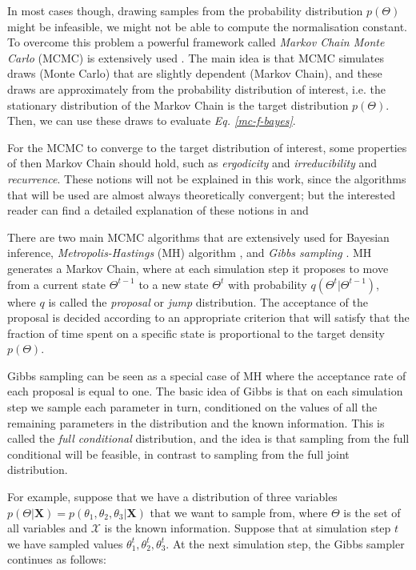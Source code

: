 In most cases though, drawing samples from the probability distribution $p(\Theta)$ might be infeasible, \eg we might not be able to compute the normalisation constant. To overcome this problem a powerful framework called \emph{Markov Chain Monte Carlo} (MCMC) is extensively used \citep{Neal1998}. The main idea is that MCMC simulates draws (\ie Monte Carlo) that are slightly dependent (\ie Markov Chain), and these draws are approximately from the probability distribution of interest, i.e. the stationary distribution of the Markov Chain is the target distribution $p(\Theta)$. Then, we can use these draws to evaluate \emph{Eq. \ref{mc-f-bayes}}.

For the MCMC to converge to the target distribution of interest, some properties of then Markov Chain should hold, such as \emph{ergodicity} and \emph{irreducibility} and \emph{recurrence}. These notions will not be explained in this work, since the algorithms that will be used are almost always theoretically convergent; but the interested reader can find a detailed explanation of these notions in \citet{Robert1999} and \citet{Liu2001}

There are two main MCMC algorithms that are extensively used for Bayesian inference, \emph{Metropolis-Hastings} (MH) algorithm \citep{Metropolis1953, Hastings1970}, and \emph{Gibbs sampling} \citep{Geman1984, Gelfand1990}. MH generates a Markov Chain, where at each simulation step it proposes to move from a current state $\Theta^{t-1}$ to a new state $\Theta^{t}$ with probability $q(\Theta^{t}|\Theta^{t-1})$, where $q$ is called the \emph{proposal} or \emph{jump} distribution. The acceptance of the proposal is decided according to an appropriate criterion that will satisfy that the fraction of time spent on a specific state is proportional to the target density $p(\Theta)$.

Gibbs sampling can be seen as a special case of MH where the acceptance rate of each proposal is equal to one. The basic idea of Gibbs is that on each simulation step we sample each parameter in turn, conditioned on the values of all the remaining parameters in the distribution and the known information. This is called the \emph{full conditional} distribution, and the idea is that sampling from the full conditional will be feasible, in contrast to sampling from the full joint distribution.

For example, suppose that we have a distribution of three variables $p(\Theta|\mathbf{X}) = p(\theta_{1}, \theta_{2}, \theta_{3}|\mathbf{X})$ that we want to sample from, where $\Theta$ is the set of all variables and $\mathcal{X}$ is the known information. Suppose that at simulation step $t$ we have sampled values $\theta_{1}^{t}, \theta_{2}^{t}, \theta_{3}^{t}$. At the next simulation step, the Gibbs sampler continues as follows:

